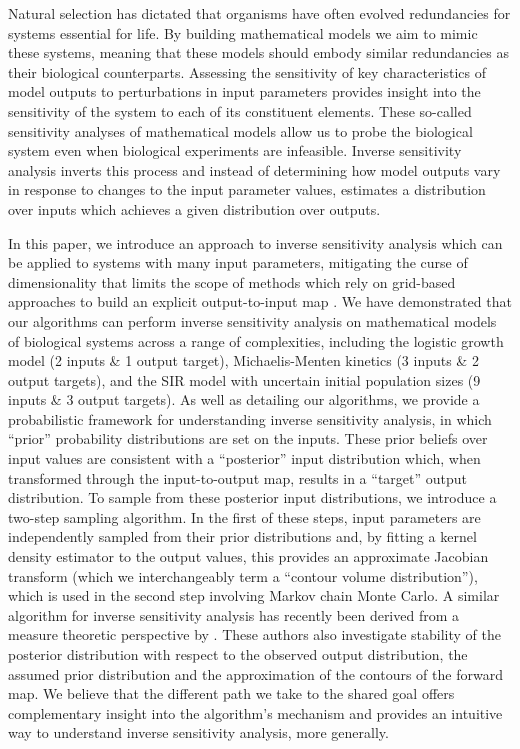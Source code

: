 \documentclass[10pt,letterpaper]{article}
\begin{document}
Natural selection has dictated that organisms have often evolved redundancies for systems essential for life. By building mathematical models we aim to mimic these systems, meaning that these models should embody similar redundancies as their biological counterparts. Assessing the sensitivity of key characteristics of model outputs to perturbations in input parameters provides insight into the sensitivity of the system to each of its constituent elements. These so-called sensitivity analyses of mathematical models allow us to probe the biological system even when biological experiments are infeasible. Inverse sensitivity analysis inverts this process and instead of determining how model outputs vary in response to changes to the input parameter values, estimates a distribution over inputs which achieves a given distribution over outputs.

In this paper, we introduce an approach to inverse sensitivity analysis which can be applied to systems with many input parameters, mitigating the curse of dimensionality that limits the scope of  methods which rely on grid-based approaches to build an explicit output-to-input map \cite{butler2014measure}. We have demonstrated that our algorithms can perform inverse sensitivity analysis on mathematical models of biological systems across a range of complexities, including the logistic growth model (2 inputs \& 1 output target), Michaelis-Menten kinetics (3 inputs \& 2 output targets), and the SIR model with uncertain initial population sizes (9 inputs \& 3 output targets). As well as detailing our algorithms, we provide a probabilistic framework for understanding inverse sensitivity analysis, in which ``prior'' probability distributions are set on the inputs. These prior beliefs over input values are consistent with a ``posterior'' input distribution which, when transformed through the input-to-output map, results in a ``target'' output distribution. To sample from these posterior input distributions, we introduce a two-step sampling algorithm. In the first of these steps, input parameters are independently sampled from their prior distributions and, by fitting a kernel density estimator to the output values, this provides an approximate Jacobian transform (which we interchangeably term a ``contour volume distribution''), which is used in the second step involving Markov chain Monte Carlo. A similar algorithm for inverse sensitivity analysis has recently been derived from a measure theoretic perspective by \cite{BJW-17}. These authors also investigate stability of the posterior distribution with respect to the observed output distribution, the assumed prior distribution and the approximation of the contours of the forward map. We believe that the different path we take to the shared goal offers complementary insight into the algorithm's mechanism and provides an intuitive way to understand inverse sensitivity analysis, more generally.
\end{document}
